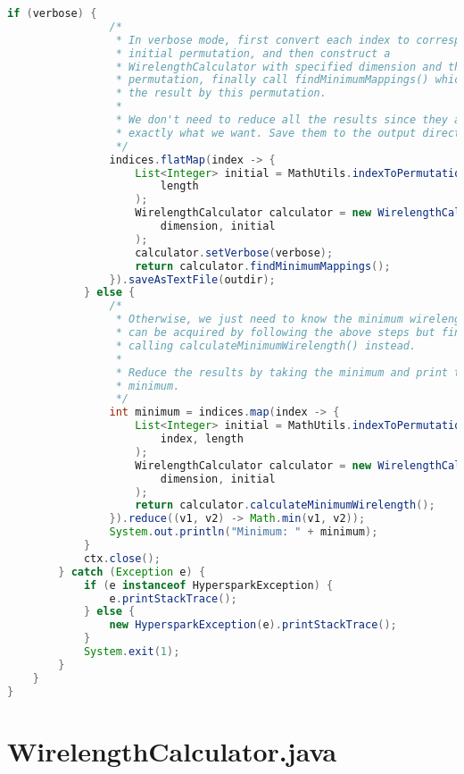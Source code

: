 \begin{lstlisting}[language = Java]
			if (verbose) {
				/*
				 * In verbose mode, first convert each index to corresponding
				 * initial permutation, and then construct a
				 * WirelengthCalculator with specified dimension and the initial
				 * permutation, finally call findMinimumMappings() which returns
				 * the result by this permutation.
				 *
				 * We don't need to reduce all the results since they are
				 * exactly what we want. Save them to the output directory.
				 */
				indices.flatMap(index -> {
					List<Integer> initial = MathUtils.indexToPermutation(index,
						length
					);
					WirelengthCalculator calculator = new WirelengthCalculator(
						dimension, initial
					);
					calculator.setVerbose(verbose);
					return calculator.findMinimumMappings();
				}).saveAsTextFile(outdir);
			} else {
				/*
				 * Otherwise, we just need to know the minimum wirelength, which
				 * can be acquired by following the above steps but finally
				 * calling calculateMinimumWirelength() instead.
				 *
				 * Reduce the results by taking the minimum and print the final
				 * minimum.
				 */
				int minimum = indices.map(index -> {
					List<Integer> initial = MathUtils.indexToPermutation(
						index, length
					);
					WirelengthCalculator calculator = new WirelengthCalculator(
						dimension, initial
					);
					return calculator.calculateMinimumWirelength();
				}).reduce((v1, v2) -> Math.min(v1, v2));
				System.out.println("Minimum: " + minimum);
			}
			ctx.close();
		} catch (Exception e) {
			if (e instanceof HypersparkException) {
				e.printStackTrace();
			} else {
				new HypersparkException(e).printStackTrace();
			}
			System.exit(1);
		}
	}
}
\end{lstlisting}

\clearpage
\section{WirelengthCalculator.java}
\label{Section A.2}

